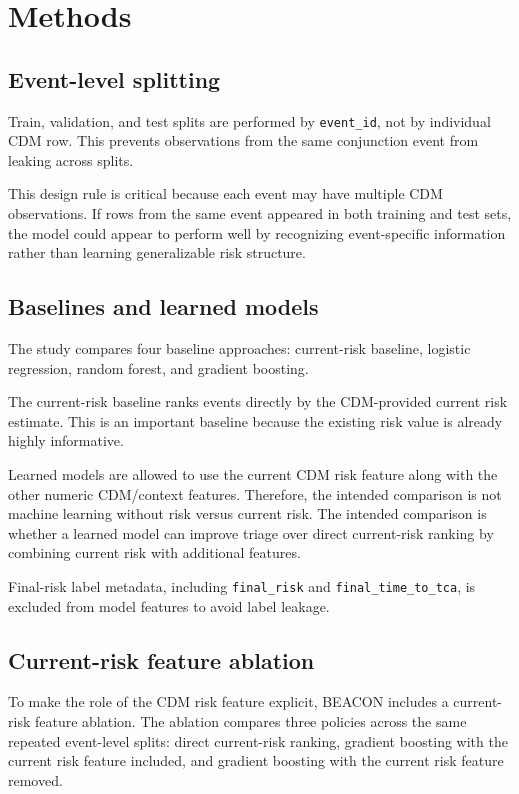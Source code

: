 \documentclass[11pt]{article}
\begin{document}
\FloatBarrier

\section{Methods}

\subsection{Event-level splitting}

Train, validation, and test splits are performed by \texttt{event\_id}, not by individual CDM row. This prevents observations from the same conjunction event from leaking across splits.

This design rule is critical because each event may have multiple CDM observations. If rows from the same event appeared in both training and test sets, the model could appear to perform well by recognizing event-specific information rather than learning generalizable risk structure.

\subsection{Baselines and learned models}

The study compares four baseline approaches: current-risk baseline, logistic regression, random forest, and gradient boosting.

The current-risk baseline ranks events directly by the CDM-provided current risk estimate. This is an important baseline because the existing risk value is already highly informative.

Learned models are allowed to use the current CDM risk feature along with the other numeric CDM/context features. Therefore, the intended comparison is not machine learning without risk versus current risk. The intended comparison is whether a learned model can improve triage over direct current-risk ranking by combining current risk with additional features.

Final-risk label metadata, including \texttt{final\_risk} and \texttt{final\_time\_to\_tca}, is excluded from model features to avoid label leakage.

\subsection{Current-risk feature ablation}

To make the role of the CDM risk feature explicit, BEACON includes a current-risk feature ablation. The ablation compares three policies across the same repeated event-level splits: direct current-risk ranking, gradient boosting with the current risk feature included, and gradient boosting with the current risk feature removed.
\end{document}
